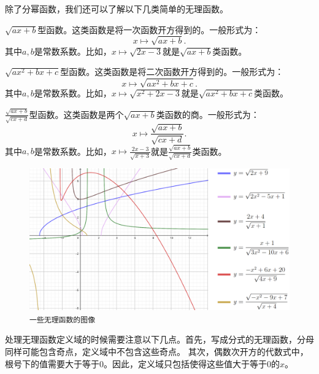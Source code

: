 \documentclass[12pt,UTF8]{ctexbook}
\begin{document}
除了分幂函数，我们还可以了解以下几类简单的无理函数。

$\sqrt{ax + b}$型函数。这类函数是将一次函数开方得到的。一般形式为：
$$ x\mapsto \sqrt{ax + b}.$$
其中$a, b$是常数系数。比如，$x\mapsto \sqrt{2x - 3}$就是$\sqrt{ax + b}$类函数。

$\sqrt{ax^2 + bx + c}$型函数。这类函数是将二次函数开方得到的。一般形式为：
$$ x\mapsto \sqrt{ax^2 + bx + c}.$$
其中$a, b$是常数系数。比如，$x\mapsto \sqrt{x^2 + 2x - 3}$就是$\sqrt{ax^2 + bx + c}$类函数。

$\frac{\sqrt{ax + b}}{\sqrt{cx + d}}$型函数。这类函数是两个$\sqrt{ax + b}$类函数的商。一般形式为：
$$ x\mapsto \frac{\sqrt{ax + b}}{\sqrt{cx + d}}.$$
其中$a, b$是常数系数。比如，$x\mapsto \frac{2x - 3}{\sqrt{x + 3}}$就是$\frac{\sqrt{ax + b}}{\sqrt{cx + d}}$类函数。

\begin{figure}[h]
    \vspace{4pt}
    \centering
    \includegraphics[width=0.96
    \textwidth]{无理函数1.png}
    \caption*{\texttt{一些无理函数的图像}}
\end{figure}

处理无理函数定义域的时候需要注意以下几点。首先，写成分式的无理函数，分母同样可能包含奇点，定义域中不包含这些奇点。
其次，偶数次开方的代数式中，根号下的值需要大于等于$0$。因此，定义域只包括使得这些值大于等于$0$的$x$。
\end{document}
